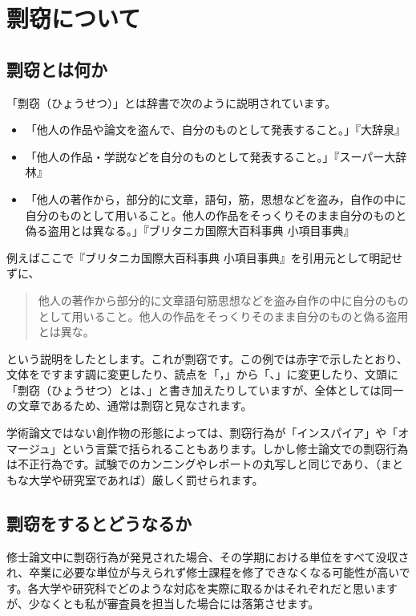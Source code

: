 \chapter{剽窃について}
\label{chap:plagiarism}
\section{剽窃とは何か}
\label{sec:plagiarism}
「剽窃（ひょうせつ）」とは辞書で次のように説明されています。
\begin{itemize}
\item 「他人の作品や論文を盗んで、自分のものとして発表すること。」『大辞泉』
\item 「他人の作品・学説などを自分のものとして発表すること。」『スーパー大辞林』
\item 「他人の著作から，部分的に文章，語句，筋，思想などを盗み，自作の中に自分のものとして用いること。他人の作品をそっくりそのまま自分のものと偽る盗用とは異なる。」『ブリタニカ国際大百科事典 小項目事典』
\end{itemize}

例えばここで『ブリタニカ国際大百科事典 小項目事典』を引用元として明記せずに、
\begin{quotation}
  他人の著作から部分的に文章語句筋思想などを盗み自作の中に自分のものとして用いること。他人の作品をそっくりそのまま自分のものと偽る盗用とは異な。
\end{quotation}
という説明をしたとします。これが剽窃です。この例では赤字で示したとおり、文体をですます調に変更したり、読点を「，」から「、」に変更したり、文頭に「剽窃（ひょうせつ）とは、」と書き加えたりしていますが、全体としては同一の文章であるため、通常は剽窃と見なされます。

学術論文ではない創作物の形態によっては、剽窃行為が「インスパイア」や「オマージュ」という言葉で括られることもあります。しかし修士論文での剽窃行為は不正行為です。試験でのカンニングやレポートの丸写しと同じであり、（まともな大学や研究室であれば）厳しく罰せられます。

\section{剽窃をするとどうなるか}

修士論文中に剽窃行為が発見された場合、その学期における単位をすべて没収され、卒業に必要な単位が与えられず修士課程を修了できなくなる可能性が高いです。各大学や研究科でどのような対応を実際に取るかはそれぞれだと思いますが、少なくとも私が審査員を担当した場合には落第させます。


